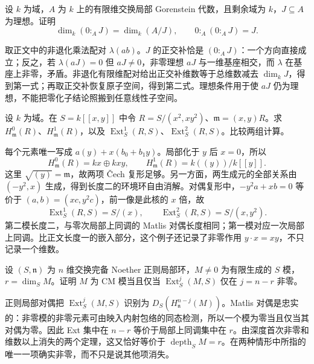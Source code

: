 \begin{optionalexercise}\label{b3:ex:22-annihilator-duality}
	设 \(k\) 为域，\(A\) 为 \(k\) 上的有限维交换局部 Gorenstein 代数，且剩余域为 \(k\)，\(J\subseteq A\) 为理想。证明
	\[
		\dim_k(0:_AJ)=\dim_k(A/J),\qquad 0:_A(0:_AJ)=J.
	\]
\end{optionalexercise}
\begin{solution}
	取正文中的非退化乘法配对 \(\lambda(ab)\)。\(J\) 的正交补恰是 \((0:_AJ)\)：一个方向直接成立；反之，若 \(\lambda(aJ)=0\) 但 \(aJ\ne0\)，非零理想 \(aJ\) 与一维基座相交，而 \(\lambda\) 在基座上非零，矛盾。非退化有限维配对给出正交补维数等于总维数减去 \(\dim_kJ\)，得到第一式；再取正交补恢复原子空间，得到第二式。理想条件用于使 \(aJ\) 仍为理想，不能把零化子结论照搬到任意线性子空间。
\end{solution}

\begin{optionalexercise}\label{b3:ex:22-longer-embedded-component}
	设 \(k\) 为域。在 \(S=k[\![x,y]\!]\) 中令 \(R=S/(x^2,xy^2)\)、\(\mathfrak m=(x,y)R\)。求 \(H_{\mathfrak m}^0(R)\)、\(H_{\mathfrak m}^1(R)\)，以及 \(\operatorname{Ext}_S^1(R,S)\)、\(\operatorname{Ext}_S^2(R,S)\)。比较两组计算。
\end{optionalexercise}
\begin{solution}
	每个元素唯一写成 \(a(y)+x(b_0+b_1y)\)。局部化于 \(y\) 后 \(x=0\)，所以
	\[
		H_{\mathfrak m}^0(R)=kx\oplus kxy,\qquad H_{\mathfrak m}^1(R)=k(\!(y)\!)/k[\![y]\!].
	\]
	这里 \(\sqrt{(y)}=\mathfrak m\)，故两项 Čech 复形足够。另一方面，两生成元的全部关系由 \((-y^2,x)\) 生成，得到长度二的环境环自由消解。对偶复形中，\(-y^2a+xb=0\) 等价于 \((a,b)=(xc,y^2c)\)，前一像是此核的 \(x\) 倍，故
	\[
		\operatorname{Ext}_S^1(R,S)=S/(x),\qquad \operatorname{Ext}_S^2(R,S)=S/(x,y^2).
	\]
	第二模长度二，与零次局部上同调的 Matlis 对偶长度相同；第一模对应一次局部上同调。比正文长度一的嵌入部分，这个例子还记录了非零作用 \(y\cdot x=xy\)，不只记录一个维数。
\end{solution}

\begin{optionalexercise}\label{b3:ex:22-cm-module-environment-ext}
	设 \((S,\mathfrak n)\) 为 \(n\) 维交换完备 Noether 正则局部环，\(M\ne0\) 为有限生成的 \(S\) 模，\(r=\dim_SM\)。证明 \(M\) 为 CM 模当且仅当 \(\operatorname{Ext}_S^j(M,S)\) 仅在 \(j=n-r\) 非零。
\end{optionalexercise}
\begin{solution}
	正则局部对偶把 \(\operatorname{Ext}_S^j(M,S)\) 识别为 \(D_S(H_{\mathfrak n}^{n-j}(M))\)。Matlis 对偶是忠实的：非零模的非零元素可由映入内射包络的同态检测，所以一个模为零当且仅当其对偶为零。因此 Ext 集中在 \(n-r\) 等价于局部上同调集中在 \(r\)。由深度首次非零和维数以上消失的两个定理，这又恰好等价于 \(\operatorname{depth}_SM=r\)。在两种情形中所指的唯一一项确实非零，而不只是说其他项消失。
\end{solution}
